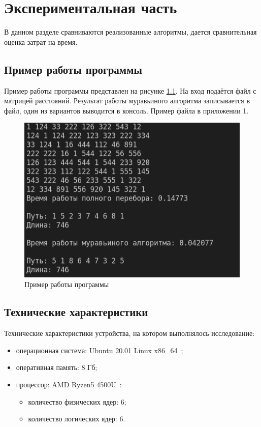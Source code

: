 \documentclass[a4paper,oneside,14pt]{extreport}
\begin{document}
\chapter{Экспериментальная часть}
В данном разделе сравниваются реализованные алгоритмы, дается сравнительная оценка затрат на время.

\section{Пример работы программы}
Пример работы программы представлен на рисунке \ref{fig:ex}. На вход подаётся файл с матрицей расстояний. Результат работы муравьиного алгоритма записывается в файл, один из вариантов выводится в консоль. Пример файла в приложении 1.
\captionsetup{singlelinecheck=true}
\begin{figure}[H]
	\centering
	\includegraphics[width=1\linewidth]{images/ex}
	\caption{Пример работы программы}
	\label{fig:ex}
\end{figure}

\section{Технические характеристики}
Технические характеристики устройства, на котором выполнялось исследование:
\begin{itemize}
	\item операционная система: Ubuntu 20.01 Linux x86\_64~\cite{ubuntu};
	\item оперативная память: 8 Гб;
	\item процессор: AMD Ryzen5 4500U~\cite{processor}:
	\begin{itemize}
		\item количество физических ядер: 6;
		\item количество логических ядер: 6.
	\end{itemize}
\end{itemize}
\end{document}
